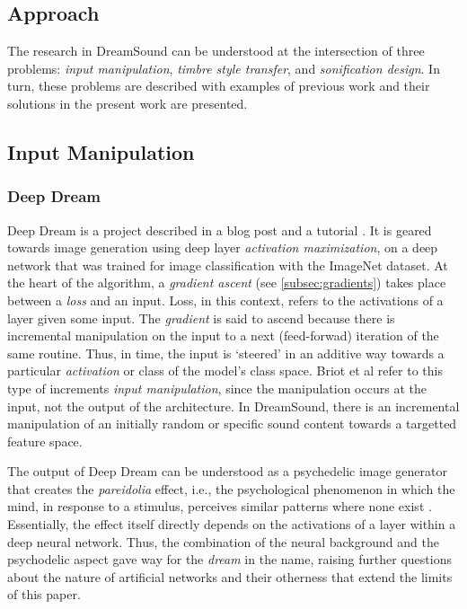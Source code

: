 \documentclass[a4paper,10pt,oneside]{article}
\begin{document}
\begin{sloppy}
\section{Approach}

The research in DreamSound can be understood at the intersection of three problems: \textit{input manipulation}, \textit{timbre style transfer}, and \textit{sonification design}. In turn, these problems are described with examples of previous work and their solutions in the present work are presented.

\subsection{Input Manipulation}


\subsubsection{Deep Dream}
Deep Dream is a project described in a blog post \cite{Mordvintsev2015} and a tutorial \cite{DeepDreamTutorial}. It is geared towards image generation using deep layer \textit{activation maximization}, on a deep network \cite{szegedy2014going} that was trained for image classification with the ImageNet \cite{ILSVRC15} dataset. At the heart of the algorithm, a \textit{gradient ascent} (see \ref{subsec:gradients}) takes place between a \textit{loss} and an input. Loss, in this context, refers to the activations of a layer given some input. The \textit{gradient} is said to ascend because there is incremental manipulation on the input to a next (feed-forwad) iteration of the same routine. Thus, in time, the input is `steered' in an additive way towards a particular \textit{activation} or class of the model's class space. Briot et al \cite{Briot2017} refer to this type of increments \textit{input manipulation}, since the manipulation occurs at the input, not the output of the architecture. In DreamSound, there is an incremental manipulation of an initially random or specific sound content towards a targetted feature space.

The output of Deep Dream can be understood as a psychedelic image generator that creates the \textit{pareidolia} effect, i.e., the psychological phenomenon in which the mind, in response to a stimulus, perceives similar patterns where none exist \cite{Briot2017}. Essentially, the effect itself directly depends on the activations of a layer within a deep neural network. Thus, the combination of the neural background and the psychodelic aspect gave way for the \textit{dream} in the name, raising further questions about the nature of artificial networks and their otherness that extend the limits of this paper.


\end{sloppy}
\end{document}
